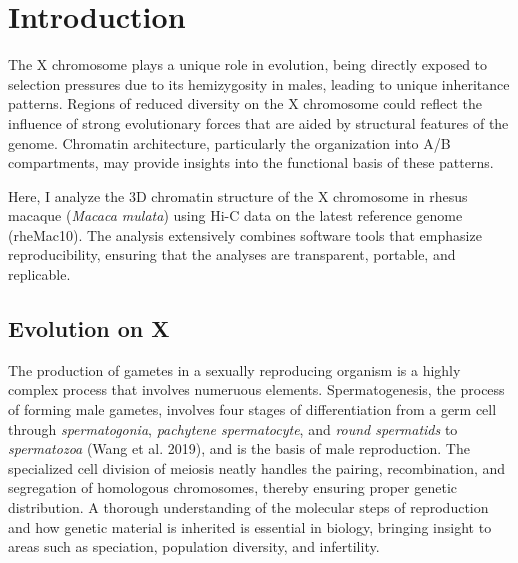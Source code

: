 \documentclass[
  11pt,
  a4paper,
]{scrbook}
\renewcommand*\contentsname{Table of contents}
\newcommand\contentsname{Table of contents}
\begin{document}
\renewcommand*\contentsname{Table of contents}
{
\setcounter{tocdepth}{2}
\tableofcontents
}

\mainmatter
\chapter{Introduction}\label{introduction}

The X chromosome plays a unique role in evolution, being directly
exposed to selection pressures due to its hemizygosity in males, leading
to unique inheritance patterns. Regions of reduced diversity on the X
chromosome could reflect the influence of strong evolutionary forces
that are aided by structural features of the genome. Chromatin
architecture, particularly the organization into A/B compartments, may
provide insights into the functional basis of these patterns.

Here, I analyze the 3D chromatin structure of the X chromosome in rhesus
macaque (\emph{Macaca mulata}) using Hi-C data on the latest reference
genome (rheMac10). The analysis extensively combines software tools that
emphasize reproducibility, ensuring that the analyses are transparent,
portable, and replicable.

\section{Evolution on X}\label{evolution-on-x}

The production of gametes in a sexually reproducing organism is a highly
complex process that involves numeruous elements. Spermatogenesis, the
process of forming male gametes, involves four stages of differentiation
from a germ cell through \emph{spermatogonia}, \emph{pachytene
spermatocyte}, and \emph{round spermatids} to \emph{spermatozoa} (Wang
et al. 2019), and is the basis of male reproduction. The specialized
cell division of meiosis neatly handles the pairing, recombination, and
segregation of homologous chromosomes, thereby ensuring proper genetic
distribution. A thorough understanding of the molecular steps of
reproduction and how genetic material is inherited is essential in
biology, bringing insight to areas such as speciation, population
diversity, and infertility.
\end{document}

